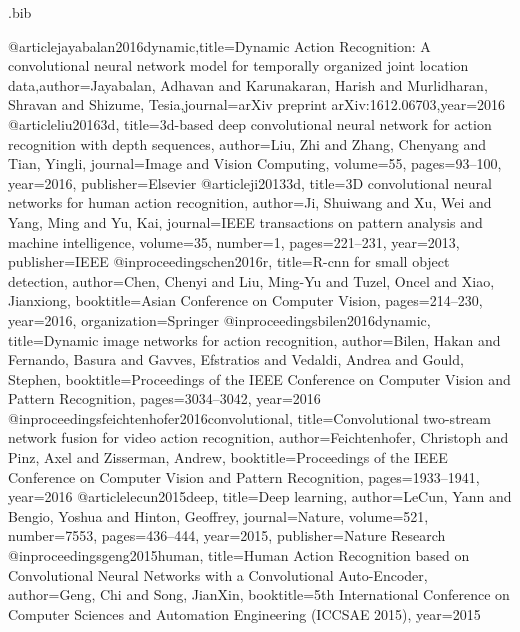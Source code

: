 \RequirePackage{filecontents}
\begin{filecontents}{\jobname.bib}

@article{jayabalan2016dynamic,title={Dynamic Action Recognition: A convolutional neural network model for temporally organized joint location data},author={Jayabalan, Adhavan and Karunakaran, Harish and Murlidharan, Shravan and Shizume, Tesia},journal={arXiv preprint arXiv:1612.06703},year={2016}
}
@article{liu20163d,
  title={3d-based deep convolutional neural network for action recognition with depth sequences},
  author={Liu, Zhi and Zhang, Chenyang and Tian, Yingli},
  journal={Image and Vision Computing},
  volume={55},
  pages={93--100},
  year={2016},
  publisher={Elsevier}
}
@article{ji20133d,
  title={3D convolutional neural networks for human action recognition},
  author={Ji, Shuiwang and Xu, Wei and Yang, Ming and Yu, Kai},
  journal={IEEE transactions on pattern analysis and machine intelligence},
  volume={35},
  number={1},
  pages={221--231},
  year={2013},
  publisher={IEEE}
}
@inproceedings{chen2016r,
  title={R-cnn for small object detection},
  author={Chen, Chenyi and Liu, Ming-Yu and Tuzel, Oncel and Xiao, Jianxiong},
  booktitle={Asian Conference on Computer Vision},
  pages={214--230},
  year={2016},
  organization={Springer}
}
@inproceedings{bilen2016dynamic,
  title={Dynamic image networks for action recognition},
  author={Bilen, Hakan and Fernando, Basura and Gavves, Efstratios and Vedaldi, Andrea and Gould, Stephen},
  booktitle={Proceedings of the IEEE Conference on Computer Vision and Pattern Recognition},
  pages={3034--3042},
  year={2016}
}
@inproceedings{feichtenhofer2016convolutional,
  title={Convolutional two-stream network fusion for video action recognition},
  author={Feichtenhofer, Christoph and Pinz, Axel and Zisserman, Andrew},
  booktitle={Proceedings of the IEEE Conference on Computer Vision and Pattern Recognition},
  pages={1933--1941},
  year={2016}
}
@article{lecun2015deep,
  title={Deep learning},
  author={LeCun, Yann and Bengio, Yoshua and Hinton, Geoffrey},
  journal={Nature},
  volume={521},
  number={7553},
  pages={436--444},
  year={2015},
  publisher={Nature Research}
}
@inproceedings{geng2015human,
  title={Human Action Recognition based on Convolutional Neural Networks with a Convolutional Auto-Encoder},
  author={Geng, Chi and Song, JianXin},
  booktitle={5th International Conference on Computer Sciences and Automation Engineering (ICCSAE 2015)},
  year={2015}
}
\end{filecontents}


